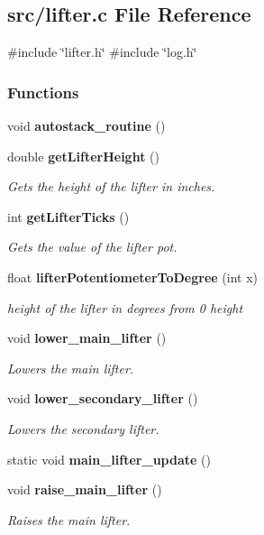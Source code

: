 \subsection{src/lifter.c File Reference}
\label{a00107}
{\ttfamily \#include \char`\"{}lifter.\+h\char`\"{}}\newline
{\ttfamily \#include \char`\"{}log.\+h\char`\"{}}\newline
\subsubsection*{Functions}
\begin{DoxyCompactItemize}
\item 
void \textbf{ autostack\+\_\+routine} ()
\item 
double \textbf{ get\+Lifter\+Height} ()
\begin{DoxyCompactList}\small\item\em Gets the height of the lifter in inches. \end{DoxyCompactList}\item 
int \textbf{ get\+Lifter\+Ticks} ()
\begin{DoxyCompactList}\small\item\em Gets the value of the lifter pot. \end{DoxyCompactList}\item 
float \textbf{ lifter\+Potentiometer\+To\+Degree} (int x)
\begin{DoxyCompactList}\small\item\em height of the lifter in degrees from 0 height \end{DoxyCompactList}\item 
void \textbf{ lower\+\_\+main\+\_\+lifter} ()
\begin{DoxyCompactList}\small\item\em Lowers the main lifter. \end{DoxyCompactList}\item 
void \textbf{ lower\+\_\+secondary\+\_\+lifter} ()
\begin{DoxyCompactList}\small\item\em Lowers the secondary lifter. \end{DoxyCompactList}\item 
static void \textbf{ main\+\_\+lifter\+\_\+update} ()
\item 
void \textbf{ raise\+\_\+main\+\_\+lifter} ()
\begin{DoxyCompactList}\small\item\em Raises the main lifter. \end{DoxyCompactList}\item 

\end{DoxyCompactItemize}
